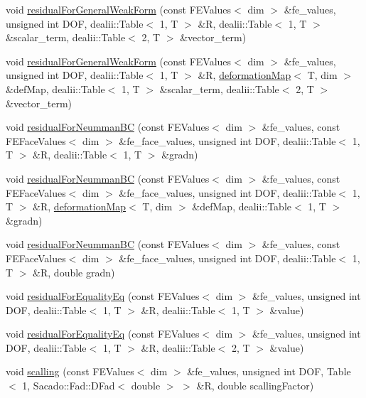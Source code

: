 \begin{DoxyCompactItemize}
\item 
void \mbox{\hyperlink{class_residual_ab90bb5476a96c0e7098264562b313b7b}{residual\+For\+General\+Weak\+Form}} (const F\+E\+Values$<$ dim $>$ \&fe\+\_\+values, unsigned int D\+OF, dealii\+::\+Table$<$ 1, T $>$ \&R, dealii\+::\+Table$<$ 1, T $>$ \&scalar\+\_\+term, dealii\+::\+Table$<$ 2, T $>$ \&vector\+\_\+term)
\item 
void \mbox{\hyperlink{class_residual_a478a5fee7d75f3a16707ad5915a34d3f}{residual\+For\+General\+Weak\+Form}} (const F\+E\+Values$<$ dim $>$ \&fe\+\_\+values, unsigned int D\+OF, dealii\+::\+Table$<$ 1, T $>$ \&R, \mbox{\hyperlink{structdeformation_map}{deformation\+Map}}$<$ T, dim $>$ \&def\+Map, dealii\+::\+Table$<$ 1, T $>$ \&scalar\+\_\+term, dealii\+::\+Table$<$ 2, T $>$ \&vector\+\_\+term)
\item 
void \mbox{\hyperlink{class_residual_ad0e81fca1fe14909b80e709c1e93e393}{residual\+For\+Neumman\+BC}} (const F\+E\+Values$<$ dim $>$ \&fe\+\_\+values, const F\+E\+Face\+Values$<$ dim $>$ \&fe\+\_\+face\+\_\+values, unsigned int D\+OF, dealii\+::\+Table$<$ 1, T $>$ \&R, dealii\+::\+Table$<$ 1, T $>$ \&gradn)
\item 
void \mbox{\hyperlink{class_residual_af2aedfc68848cd35cac392aad840db05}{residual\+For\+Neumman\+BC}} (const F\+E\+Values$<$ dim $>$ \&fe\+\_\+values, const F\+E\+Face\+Values$<$ dim $>$ \&fe\+\_\+face\+\_\+values, unsigned int D\+OF, dealii\+::\+Table$<$ 1, T $>$ \&R, \mbox{\hyperlink{structdeformation_map}{deformation\+Map}}$<$ T, dim $>$ \&def\+Map, dealii\+::\+Table$<$ 1, T $>$ \&gradn)
\item 
void \mbox{\hyperlink{class_residual_a1e66cf9fc807561fc00cffb93c52d37d}{residual\+For\+Neumman\+BC}} (const F\+E\+Values$<$ dim $>$ \&fe\+\_\+values, const F\+E\+Face\+Values$<$ dim $>$ \&fe\+\_\+face\+\_\+values, unsigned int D\+OF, dealii\+::\+Table$<$ 1, T $>$ \&R, double gradn)
\item 
void \mbox{\hyperlink{class_residual_a130e92c5dacfaf8cb43adab6aa588eb3}{residual\+For\+Equality\+Eq}} (const F\+E\+Values$<$ dim $>$ \&fe\+\_\+values, unsigned int D\+OF, dealii\+::\+Table$<$ 1, T $>$ \&R, dealii\+::\+Table$<$ 1, T $>$ \&value)
\item 
void \mbox{\hyperlink{class_residual_aec6bd7f3e82fa9b13de1dc4074801afd}{residual\+For\+Equality\+Eq}} (const F\+E\+Values$<$ dim $>$ \&fe\+\_\+values, unsigned int D\+OF, dealii\+::\+Table$<$ 1, T $>$ \&R, dealii\+::\+Table$<$ 2, T $>$ \&value)
\item 
void \mbox{\hyperlink{class_residual_a339d8e3f5d146ad54951896c5f1e3d19}{scalling}} (const F\+E\+Values$<$ dim $>$ \&fe\+\_\+values, unsigned int D\+OF, Table$<$ 1, Sacado\+::\+Fad\+::\+D\+Fad$<$ double $>$ $>$ \&R, double scalling\+Factor)

\end{DoxyCompactItemize}
